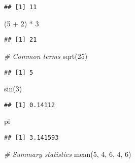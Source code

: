 \documentclass[
]{article}
\newenvironment{Shaded}{\begin{snugshade}}{\end{snugshade}}
\newcommand{\CommentTok}[1]{\textcolor[rgb]{0.56,0.35,0.01}{\textit{#1}}}
\newcommand{\DecValTok}[1]{\textcolor[rgb]{0.00,0.00,0.81}{#1}}
\newcommand{\FunctionTok}[1]{\textcolor[rgb]{0.00,0.00,0.00}{#1}}
\newcommand{\NormalTok}[1]{#1}
\newcommand{\SpecialCharTok}[1]{\textcolor[rgb]{0.00,0.00,0.00}{#1}}
\begin{document}
\begin{verbatim}
## [1] 11
\end{verbatim}

\begin{Shaded}
\begin{Highlighting}[]
\NormalTok{(}\DecValTok{5} \SpecialCharTok{+} \DecValTok{2}\NormalTok{) }\SpecialCharTok{*} \DecValTok{3}
\end{Highlighting}
\end{Shaded}

\begin{verbatim}
## [1] 21
\end{verbatim}

\begin{Shaded}
\begin{Highlighting}[]
\CommentTok{\# Common terms}
\FunctionTok{sqrt}\NormalTok{(}\DecValTok{25}\NormalTok{)}
\end{Highlighting}
\end{Shaded}

\begin{verbatim}
## [1] 5
\end{verbatim}

\begin{Shaded}
\begin{Highlighting}[]
\FunctionTok{sin}\NormalTok{(}\DecValTok{3}\NormalTok{)}
\end{Highlighting}
\end{Shaded}

\begin{verbatim}
## [1] 0.14112
\end{verbatim}

\begin{Shaded}
\begin{Highlighting}[]
\NormalTok{pi}
\end{Highlighting}
\end{Shaded}

\begin{verbatim}
## [1] 3.141593
\end{verbatim}

\begin{Shaded}
\begin{Highlighting}[]
\CommentTok{\# Summary statistics}
\FunctionTok{mean}\NormalTok{(}\DecValTok{5}\NormalTok{, }\DecValTok{4}\NormalTok{, }\DecValTok{6}\NormalTok{, }\DecValTok{4}\NormalTok{, }\DecValTok{6}\NormalTok{)}
\end{Highlighting}
\end{Shaded}
\end{document}
